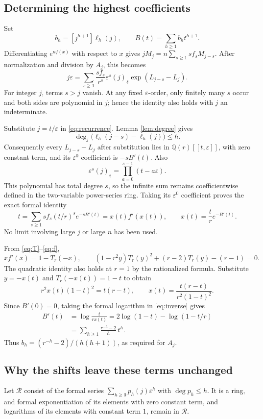 \documentclass[11pt]{article}
\newcommand{\ff}[2]{(#1)_{\underline{#2}}}
\newcommand{\eps}{\varepsilon}
\begin{document}
\subsection*{Determining the highest coefficients}
Set
\[
 b_h=[j^{h+1}]\ell_h(j),\qquad
 B(t)=\sum_{h\ge1}b_ht^{h+1}.
\]
Differentiating $e^{nf(x)}$ with respect to $x$ gives
$jM_j=n\sum_{s\ge1}sf_s M_{j-s}$. After normalization and division
by $A_j$, this becomes
\begin{equation}\label{eq:recurrence}
 j\eps=\sum_{s\ge1}\frac{sf_s}{r^s}
          \eps^s\ff{j}{s}\exp(L_{j-s}-L_j).
\end{equation}
For integer $j$, terms $s>j$ vanish. At any fixed $\eps$-order,
only finitely many $s$ occur and both sides are polynomial in $j$;
hence the identity also holds with $j$ an indeterminate.

Substitute $j=t/\eps$ in \eqref{eq:recurrence}. Lemma
\ref{lem:degree} gives
\[
 \deg_j\bigl(\ell_h(j-s)-\ell_h(j)\bigr)\le h.
\]
Consequently every $L_{j-s}-L_j$ after substitution lies in
$\mathbb Q(r)[[t,\eps]]$, with zero constant term, and its
$\eps^0$ coefficient is $-sB'(t)$. Also
\[
 \eps^s\ff{j}{s}=\prod_{a=0}^{s-1}(t-a\eps).
\]
This polynomial has total degree $s$, so the infinite sum remains
coefficientwise defined in the two-variable power-series ring.
Taking its $\eps^0$ coefficient proves the exact formal identity
\begin{equation}\label{eq:inverse}
 t=\sum_{s\ge1}sf_s(t/r)^s e^{-sB'(t)}=x(t)f'(x(t)),
 \qquad x(t)=\frac tr e^{-B'(t)}.
\end{equation}
No limit involving large $j$ or large $n$ has been used.

From \eqref{eq:T}--\eqref{eq:f},
\[
 xf'(x)=1-T_r(-x),\qquad
 (1-r^2y)T_r(y)^2+(r-2)T_r(y)-(r-1)=0.
\]
The quadratic identity also holds at $r=1$ by the rationalized
formula. Substitute $y=-x(t)$ and $T_r(-x(t))=1-t$ to obtain
\[
 r^2x(t)(1-t)^2=t(r-t),\qquad
 x(t)=\frac{t(r-t)}{r^2(1-t)^2}.
\]
Since $B'(0)=0$, taking the formal logarithm in
\eqref{eq:inverse} gives
\begin{align*}
 B'(t)&=\log\frac{t}{rx(t)}
        =2\log(1-t)-\log(1-t/r)\\
       &=\sum_{h\ge1}\frac{r^{-h}-2}{h}\,t^h.
\end{align*}
Thus $b_h=(r^{-h}-2)/(h(h+1))$, as required for $A_j$.

\subsection*{Why the shifts leave these terms unchanged}
Let $\mathcal R$ consist of the formal series
$\sum_{h\ge0}p_h(j)\eps^h$ with $\deg p_h\le h$.
It is a ring, and formal exponentiation of its elements with zero
constant term, and logarithms of its elements with constant term $1$,
remain in $\mathcal R$.
\end{document}
